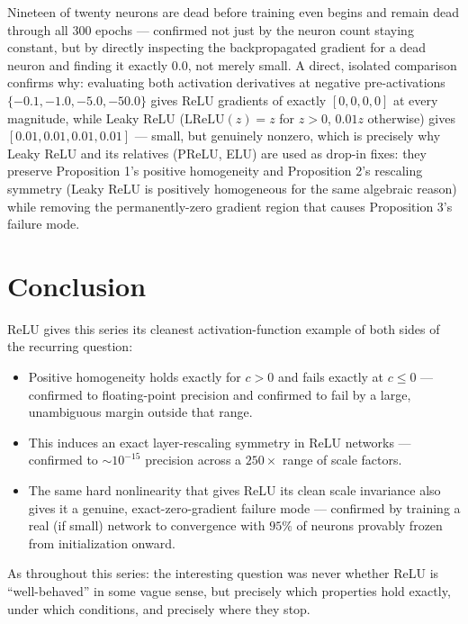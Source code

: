 \documentclass[10pt,journal,compsoc]{IEEEtran}
\begin{document}
Nineteen of twenty neurons are dead before training even begins and remain dead through all $300$ epochs — confirmed not just by the neuron count staying constant, but by directly inspecting the backpropagated gradient for a dead neuron and finding it exactly $0.0$, not merely small. A direct, isolated comparison confirms why: evaluating both activation derivatives at negative pre-activations $\{-0.1,-1.0,-5.0,-50.0\}$ gives $\mathrm{ReLU}$ gradients of exactly $[0,0,0,0]$ at every magnitude, while Leaky ReLU ($\mathrm{LReLU}(z)=z$ for $z>0$, $0.01z$ otherwise) gives $[0.01,0.01,0.01,0.01]$ — small, but genuinely nonzero, which is precisely why Leaky ReLU and its relatives (PReLU, ELU) are used as drop-in fixes: they preserve Proposition 1's positive homogeneity and Proposition 2's rescaling symmetry (Leaky ReLU is positively homogeneous for the same algebraic reason) while removing the permanently-zero gradient region that causes Proposition 3's failure mode.

\section{Conclusion}
ReLU gives this series its cleanest activation-function example of both sides of the recurring question:
\begin{itemize}
    \item Positive homogeneity holds exactly for $c>0$ and fails exactly at $c\le0$ — confirmed to floating-point precision and confirmed to fail by a large, unambiguous margin outside that range.
    \item This induces an exact layer-rescaling symmetry in ReLU networks — confirmed to $\sim\!10^{-15}$ precision across a $250\times$ range of scale factors.
    \item The same hard nonlinearity that gives ReLU its clean scale invariance also gives it a genuine, exact-zero-gradient failure mode — confirmed by training a real (if small) network to convergence with $95\%$ of neurons provably frozen from initialization onward.
\end{itemize}
As throughout this series: the interesting question was never whether ReLU is ``well-behaved'' in some vague sense, but precisely which properties hold exactly, under which conditions, and precisely where they stop.
\end{document}
